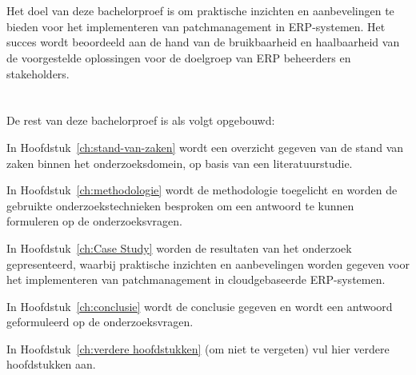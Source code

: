 \section{}%
\label{sec:onderzoeksdoelstelling}

Het doel van deze bachelorproef is om praktische inzichten en aanbevelingen te bieden voor het implementeren van patchmanagement in ERP-systemen. Het succes wordt beoordeeld aan de hand van de bruikbaarheid en haalbaarheid van de voorgestelde oplossingen voor de doelgroep van ERP beheerders en stakeholders.

\section{}%
\label{sec:opzet-bachelorproef}

De rest van deze bachelorproef is als volgt opgebouwd:


In Hoofdstuk~\ref{ch:stand-van-zaken} wordt een overzicht gegeven van de stand van zaken binnen het onderzoeksdomein, op basis van een literatuurstudie.

In Hoofdstuk~\ref{ch:methodologie} wordt de methodologie toegelicht en worden de gebruikte onderzoekstechnieken besproken om een antwoord te kunnen formuleren op de onderzoeksvragen.

In Hoofdstuk~\ref{ch:Case Study} worden de resultaten van het onderzoek gepresenteerd, waarbij praktische inzichten en aanbevelingen worden gegeven voor het implementeren van patchmanagement in cloudgebaseerde ERP-systemen.

In Hoofdstuk~\ref{ch:conclusie} wordt de conclusie gegeven en wordt een antwoord geformuleerd op de onderzoeksvragen. 

In Hoofdstuk~\ref{ch:verdere hoofdstukken} (om niet te vergeten) vul hier verdere hoofdstukken aan.